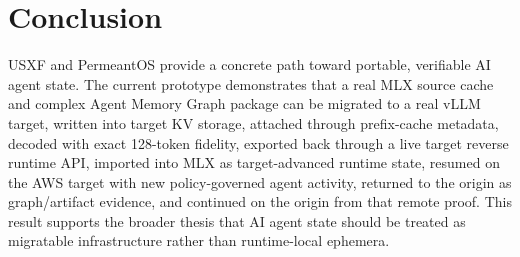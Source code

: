 \documentclass[11pt]{article}
\begin{document}
\section{Conclusion}

USXF and PermeantOS provide a concrete path toward portable, verifiable AI agent state. The current prototype demonstrates that a real MLX source cache and complex Agent Memory Graph package can be migrated to a real vLLM target, written into target KV storage, attached through prefix-cache metadata, decoded with exact 128-token fidelity, exported back through a live target reverse runtime API, imported into MLX as target-advanced runtime state, resumed on the AWS target with new policy-governed agent activity, returned to the origin as graph/artifact evidence, and continued on the origin from that remote proof. This result supports the broader thesis that AI agent state should be treated as migratable infrastructure rather than runtime-local ephemera.



\end{document}
